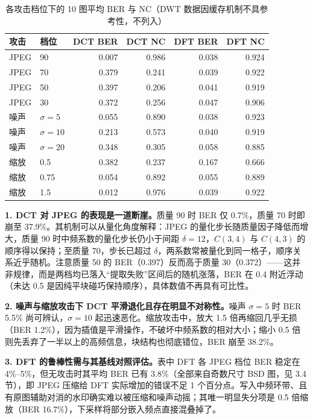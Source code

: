 \documentclass[11pt]{ctexart}
\begin{document}
\begin{table}[H]
  \centering
  \caption{各攻击档位下的 10 图平均 BER 与 NC（DWT 数据因缓存机制不具参考性，不列入）}
  \label{tab:attack}
  \begin{tabular}{llrrrr}
    \toprule
    攻击 & 档位 & DCT BER & DCT NC & DFT BER & DFT NC \\
    \midrule
    JPEG & 90 & 0.007 & 0.986 & 0.038 & 0.924 \\
    JPEG & 70 & 0.379 & 0.241 & 0.039 & 0.922 \\
    JPEG & 50 & 0.397 & 0.206 & 0.041 & 0.919 \\
    JPEG & 30 & 0.372 & 0.256 & 0.047 & 0.906 \\
    噪声 & $\sigma=5$ & 0.055 & 0.890 & 0.038 & 0.923 \\
    噪声 & $\sigma=10$ & 0.213 & 0.573 & 0.040 & 0.919 \\
    噪声 & $\sigma=20$ & 0.348 & 0.305 & 0.058 & 0.885 \\
    缩放 & 0.5 & 0.382 & 0.237 & 0.167 & 0.666 \\
    缩放 & 0.75 & 0.054 & 0.892 & 0.055 & 0.889 \\
    缩放 & 1.5 & 0.012 & 0.976 & 0.039 & 0.922 \\
    \bottomrule
  \end{tabular}
\end{table}

\textbf{1. DCT 对 JPEG 的表现是一道断崖。}质量 90 时 BER 仅 0.7\%，质量 70 时即崩至 37.9\%。其机制可以从量化角度解释：JPEG 的量化步长随质量因子降低而增大，质量 90 时中频系数的量化步长仍小于间距 $\delta=12$，$C(3,4)$ 与 $C(4,3)$ 的顺序得以保持；至质量 70，步长已超过 $\delta$，两系数常被量化到同一格子，顺序关系近乎随机。注意质量 50 的 BER（0.397）反而高于质量 30（0.372）——这并非规律，而是两档均已落入“提取失败”区间后的随机涨落，BER 在 0.4 附近浮动（未达 0.5 是因纯平块碰巧保持顺序），具体数值不再具有可比性。

\textbf{2. 噪声与缩放攻击下 DCT 平滑退化且存在明显不对称性。}噪声 $\sigma=5$ 时 BER 5.5\% 尚可辨认，$\sigma=10$ 起迅速恶化。缩放攻击中，放大 1.5 倍再缩回几乎无损（BER 1.2\%），因为插值是平滑操作，不破坏中频系数的相对大小；缩小 0.5 倍则先丢弃了一半以上的高频信息，块结构也彻底错位，BER 崩至 38.2\%。

\textbf{3. DFT 的鲁棒性需与其基线对照评估。}表中 DFT 各 JPEG 档位 BER 稳定在 4\%--5\%，但无攻击时其平均 BER 已有 3.8\%（全部来自奇数尺寸 BSD 图，见 3.4 节），即 JPEG 压缩给 DFT 实际增加的错误不足 1 个百分点。写入中频环带、且有原图辅助对消的水印确实难以被压缩和噪声动摇；其唯一明显失分项是 0.5 倍缩放（BER 16.7\%），下采样将部分嵌入频点直接混叠掉了。
\end{document}
